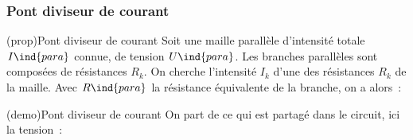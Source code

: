 \documentclass[../../main/main.tex]{subfiles}
\begin{document}
\subsubsection{Pont diviseur de courant}

\begin{tcb*}[label=prop:divcour, sidebyside, righthand ratio=.4](prop){Pont diviseur de courant}
	Soit une maille parallèle d'intensité totale $I\ind{para}$ connue, de tension
	$U\ind{para}$. Les branches parallèles sont composées de
	résistances $R_k$. On cherche l'intensité $I_k$ d'une des résistances $R_k$ de
	la maille. Avec $R\ind{para}$ la résistance équivalente de la branche, on a alors~:
	\psw{%
		\[
			\boxed{I_k = \frac{R\ind{para}}{R_k}I\ind{para}}
			\Lra
			\boxed{I_k = \frac{G_k}{G\ind{para}}I\ind{para}}
		\]
	}%
	\vspace{-15pt}
	\tcblower
	\begin{center}
	\end{center}
\end{tcb*}
\begin{tcb*}[label=demo:divcour](demo){Pont diviseur de courant}
	On part de ce qui est partagé dans le circuit, ici la tension~:
	\vspace{-15pt}
\end{tcb*}
\end{document}
